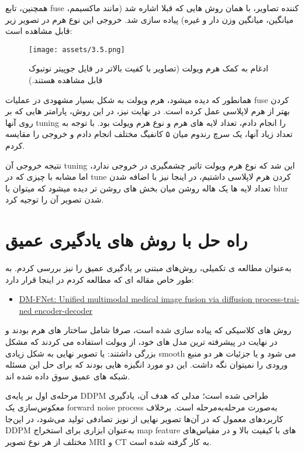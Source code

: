 \documentclass[a4paper,12pt]{article}
\begin{document}
همچنین، تابع fuse کننده تصاویر، با همان روش هایی که قبلا اشاره شد (مانند ماکسیمم، میانگین، میانگین وزن دار و غیره) پیاده سازی شد. خروجی این نوع هرم در تصویر زیر قابل مشاهده است:

\begin{figure}[h]
	\centering
	\texttt{[image: assets/3.5.png]}
	\caption{\textcolor{CustomAccent}{ادغام به کمک هرم ویولت (تصاویر با کفیت بالاتر در فایل جوپیتر نوتبوک قابل مشاهده هستند.)}}
\end{figure}

همانطور که دیده میشود، هرم ویولت به شکل بسیار مشهودی در عملیات fuse کردن بهتر از هرم لاپلاسی عمل کرده است.
در نهایت نیز، در این روش، پارامتر هایی که بر روی آنها tuning را انجام دادم، تعداد لایه های هرم و نوع هرم ویولت بود. با توجه به تعداد زیاد آنها، یک سرچ رندوم میان ۵ کانفیگ مختلف انجام دادم و خروجی را مقایسه کردم. 

نتیجه خروجی آن tuning این شد که نوع هرم ویولت تاثیر چشمگیری در خروجی ندارد، اما مشابه با چیزی که در tune کردن هرم لاپلاسی داشتیم، در اینجا نیز با اضافه شدن تعداد لایه ها یک هاله روشن میان بخش های روشن تر دیده میشود که میتوان با blur شدن تصویر آن را توجیه کرد.



\pagebreak
\section*{راه حل با روش های یادگیری عمیق}

به‌عنوان مطالعه ی تکمیلی، روش‌های مبتنی بر یادگیری عمیق را نیز بررسی کردم. به طور خاص مقاله ای که مطالعه کردم در اینجا قرار دارد:

\begin{latin}
\begin{itemize}
\item \href{https://arxiv.org/html/2506.15218v1}{DM-FNet: Unified multimodal medical image fusion via diffusion process-trained encoder-decoder}
\end{itemize}
\end{latin}
 
 روش های کلاسیکی که پیاده سازی شده است، صرفا شامل ساختار های هرم بودند و در نهایت در پیشرفته ترین مدل های خود، از ویولت استفاده می کردند که مشکل بزرگی داشتند:
 یا تصویر نهایی به شکل زیادی smooth می شود و یا جزئیات هر دو منبع ورودی را نمیتوان نگه داشت.
 این دو مورد انگیزه هایی بودند که برای حل این مسئله شبکه های عمیق سوق داده شده اند.
 
 
 مرحله‌ی اول بر پایه‌ی DDPM طراحی شده است؛ مدلی که هدف آن، یادگیری معکوس‌سازی یک forward noise process به‌صورت مرحله‌به‌مرحله است. برخلاف کاربردهای معمول که در آن‌ها تصویر نهایی از نویز تصادفی تولید می‌شود، در این‌جا DDPM به‌عنوان ابزاری برای استخراج  map feature ‌های با کیفیت بالا و در مقیاس‌های مختلف از هر نوع تصویر MRI و CT به کار گرفته شده است.
 
\end{document}
